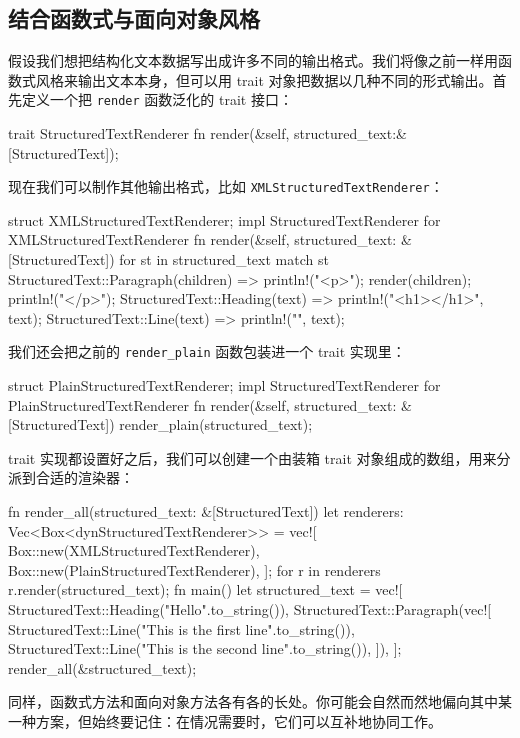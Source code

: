 \subsection{结合函数式与面向对象风格}
\label{idx:idx_dbfcb4bd}
假设我们想把结构化文本数据写出成许多不同的输出格式。我们将像之前一样用函数式风格来输出文本本身，但可以用 trait 对象把数据以几种不同的形式输出。首先定义一个把 \texttt{render} 函数泛化的 trait 接口：
\begin{codebox}[rust]
trait StructuredTextRenderer {
      fn render(&self, structured_text:&[StructuredText]);
}
\end{codebox}
现在我们可以制作其他输出格式，比如 \texttt{XMLStructuredTextRenderer}：
\begin{codebox}[rust]
struct XMLStructuredTextRenderer;
impl StructuredTextRenderer for XMLStructuredTextRenderer {
      fn render(&self, structured_text: &[StructuredText]) {
            for st in structured_text {
                  match st {
                        StructuredText::Paragraph(children) => {
                              println!("<p>");
                              render(children);
                              println!("</p>");
                        }
                        StructuredText::Heading(text) => {
                              println!("<h1>{}</h1>", text);
                        }
                        StructuredText::Line(text) => {
                              println!("{}", text);
                        }
                  }
            }
      }
}
\end{codebox}
我们还会把之前的 \texttt{render\_\allowbreak{}plain} 函数包装进一个 trait 实现里：
\begin{codebox}[rust]
struct PlainStructuredTextRenderer;
impl StructuredTextRenderer for PlainStructuredTextRenderer {
      fn render(&self, structured_text: &[StructuredText]) {
            render_plain(structured_text);
      }
}
\end{codebox}
\label{idx:idx_38c427fb}
trait 实现都设置好之后，我们可以创建一个由装箱 trait 对象组成的数组，用来分派到合适的渲染器：
\begin{codebox}[rust]
fn render_all(structured_text: &[StructuredText]) {
      let renderers: Vec<Box<dynStructuredTextRenderer>> = vec![
            Box::new(XMLStructuredTextRenderer),
            Box::new(PlainStructuredTextRenderer),
      ];
      for r in renderers {
            r.render(structured_text);
      }
}
fn main() {
      let structured_text = vec![
            StructuredText::Heading("Hello".to_string()),
            StructuredText::Paragraph(vec![
                  StructuredText::Line("This is the first line".to_string()),
                  StructuredText::Line("This is the second line".to_string()),
            ]),
      ];
      render_all(&structured_text);
}
\end{codebox}
\label{idx:idx_c614a19e}
同样，函数式方法和面向对象方法各有各的长处。你可能会自然而然地偏向其中某一种方案，但始终要记住：在情况需要时，它们可以互补地协同工作。
